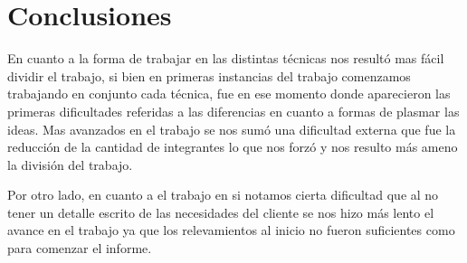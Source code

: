 \section{Conclusiones}
En cuanto a la forma de trabajar en las distintas técnicas nos resultó mas fácil dividir el trabajo, si bien en primeras instancias del trabajo comenzamos trabajando 
en conjunto cada técnica, fue en ese momento donde aparecieron las primeras dificultades referidas a las diferencias en cuanto a formas de plasmar las ideas. Mas 
avanzados en el trabajo se nos sumó una dificultad externa que fue la reducción de la cantidad de integrantes lo que nos forzó y nos resulto
más ameno la división del trabajo.

Por otro lado, en cuanto a el trabajo en si notamos cierta dificultad que al no tener un detalle escrito de las necesidades del cliente se nos hizo más lento el avance 
en el trabajo ya que los relevamientos al inicio no fueron suficientes como para comenzar el informe.


